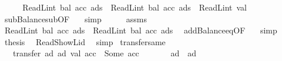 \begin{isabellebody}
\isanewline
\ \ \isamarkupfalse%
\ \isamarkupfalse%
\ {\isachardoublequoteopen}ReadL\isactrlsub i\isactrlsub n\isactrlsub t\ {\isacharparenleft}{\kern0pt}bal\ {\isacharparenleft}{\kern0pt}acc{\isacharprime}{\kern0pt}{\isacharprime}{\kern0pt}\ ads{\isacharparenright}{\kern0pt}{\isacharparenright}{\kern0pt}\ {\isacharequal}{\kern0pt}\ ReadL\isactrlsub i\isactrlsub n\isactrlsub t\ {\isacharparenleft}{\kern0pt}bal\ {\isacharparenleft}{\kern0pt}acc\ ads{\isacharparenright}{\kern0pt}{\isacharparenright}{\kern0pt}\ {\isacharminus}{\kern0pt}\ ReadL\isactrlsub i\isactrlsub n\isactrlsub t\ val{\isachardoublequoteclose}\ \isamarkupfalse%
\ subBalance{\isacharunderscore}{\kern0pt}sub{\isacharbrackleft}{\kern0pt}OF\ {\isacharasterisk}{\kern0pt}{\isacharbrackright}{\kern0pt}\ \isamarkupfalse%
\ simp\isanewline
\ \ \isamarkupfalse%
\ \isamarkupfalse%
\ assms{\isacharparenleft}{\kern0pt}{}{\isacharparenright}{\kern0pt}\ \isamarkupfalse%
\ {\isachardoublequoteopen}ReadL\isactrlsub i\isactrlsub n\isactrlsub t\ {\isacharparenleft}{\kern0pt}bal\ {\isacharparenleft}{\kern0pt}acc{\isacharprime}{\kern0pt}\ ads{\isacharparenright}{\kern0pt}{\isacharparenright}{\kern0pt}\ {\isacharequal}{\kern0pt}\ ReadL\isactrlsub i\isactrlsub n\isactrlsub t\ {\isacharparenleft}{\kern0pt}bal\ {\isacharparenleft}{\kern0pt}acc{\isacharprime}{\kern0pt}{\isacharprime}{\kern0pt}\ ads{\isacharparenright}{\kern0pt}{\isacharparenright}{\kern0pt}{\isachardoublequoteclose}\ \isamarkupfalse%
\ addBalance{\isacharunderscore}{\kern0pt}eq{\isacharbrackleft}{\kern0pt}OF\ {\isacharasterisk}{\kern0pt}{\isacharasterisk}{\kern0pt}{\isacharbrackright}{\kern0pt}\ \isamarkupfalse%
\ simp\isanewline
\ \ \isamarkupfalse%
\ \isamarkupfalse%
\ {\isacharquery}{\kern0pt}thesis\ \isamarkupfalse%
\ Read{\isacharunderscore}{\kern0pt}ShowL{\isacharunderscore}{\kern0pt}id\ \isamarkupfalse%
\ simp\isanewline
{}\isamarkupfalse%
%
\endisatagproof
{\isafoldproof}%
%
\isadelimproof
\isanewline
%
\endisadelimproof
\isanewline
{}\isamarkupfalse%
\ transfer{\isacharunderscore}{\kern0pt}same{\isacharcolon}{\kern0pt}\isanewline
\ \ \ {\isachardoublequoteopen}transfer\ ad\ ad{\isacharprime}{\kern0pt}\ val\ acc\ {\isacharequal}{\kern0pt}\ Some\ acc{\isacharprime}{\kern0pt}{\isachardoublequoteclose}\isanewline
\ \ \ \ \ \ \ {\isachardoublequoteopen}ad\ {\isacharequal}{\kern0pt}\ ad{\isacharprime}{\kern0pt}{\isachardoublequoteclose}\isanewline

\end{isabellebody}
